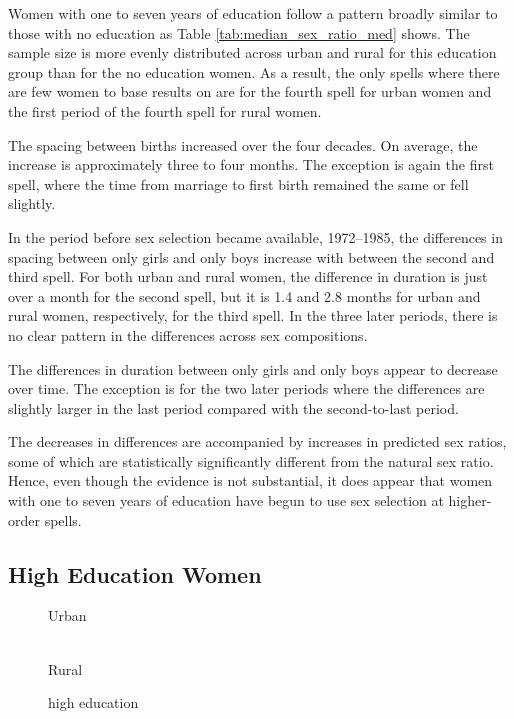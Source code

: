 \documentclass[12pt,letterpaper]{article}
\begin{document}


Women with one to seven years of education follow a pattern
broadly similar to those with no education as 
Table \ref{tab:median_sex_ratio_med} shows.
The sample size is more evenly distributed across urban and rural 
for this education group than for the no education women.
As a result, the only spells where there are few women to base 
results on are for the fourth spell for urban women and the first 
period of the fourth spell for rural women.

The spacing between births increased over the four decades.
On average, the increase is approximately three to four months.
The exception is again the first spell, where the time from
marriage to first birth remained the same or fell slightly.

In the period before sex selection became available, 1972--1985,
the differences in spacing between only girls and only boys
increase with between the second and third spell.
For both urban and rural women, the difference in duration is just over
a month for the second spell, but it is 1.4 and 2.8 months for urban and
rural women, respectively, for the third spell.
In the three later periods, there is no clear pattern
in the differences across sex compositions.

The differences in duration between only girls and only boys 
appear to decrease over time.
The exception is for the two later periods where the
differences are slightly larger in the last period compared
with the second-to-last period. 

The decreases in differences are accompanied by increases
in predicted sex ratios, some of which are statistically 
significantly different from the natural sex ratio.
Hence, even though the evidence is not substantial, it does
appear that women with one to seven years of education 
have begun to use sex selection at higher-order spells.

\subsection{High Education Women}

\begin{figure}[htpb]
\centering
\caption*{Urban}
\\
\caption*{Rural}
\caption{high education}
\end{figure}
\end{document}

